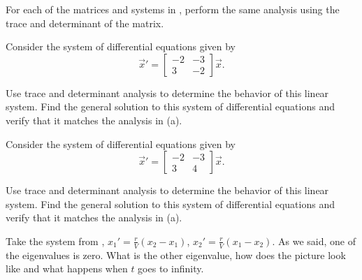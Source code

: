\begin{exercise}
For each of the matrices and systems in , perform the same analysis using the trace and determinant of the matrix.
\end{exercise}

\begin{exercise}
Consider the system of differential equations given by 
\begin{equation*}
{\vec{x}}'  = \begin{bmatrix} -2 & -3 \\ 3 & -2 \end{bmatrix} \vec{x}.
\end{equation*}
\begin{tasks}
\task Use trace and determinant analysis to determine the behavior of this linear system.
\task Find the general solution to this system of differential equations and verify that it matches the analysis in (a).
\end{tasks}
\end{exercise}

\begin{exercise}
Consider the system of differential equations given by 
\begin{equation*}
{\vec{x}}'  = \begin{bmatrix} -2 & -3 \\ 3 & 4 \end{bmatrix} \vec{x}.
\end{equation*}
\begin{tasks}
\task Use trace and determinant analysis to determine the behavior of this linear system.
\task Find the general solution to this system of differential equations and verify that it matches the analysis in (a).
\end{tasks}
\end{exercise}

\begin{exercise}
Take the system from ,
$x_1'=\frac{r}{V}(x_2-x_1)$,
$x_2'=\frac{r}{V}(x_1-x_2)$.
As we said, one of the eigenvalues is zero.  What is the other eigenvalue, how
does the picture look like and what happens when $t$ goes to infinity.
\end{exercise}

